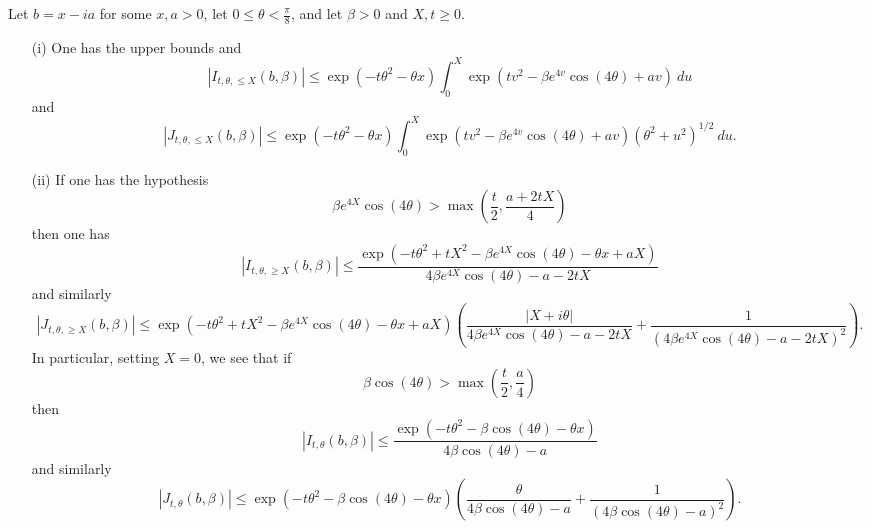 \begin{proposition}\label{tail estimates}  Let $b = x-ia$ for some $x,a>0$, let $0 \leq \theta < \frac{\pi}{8}$, and let $\beta>0$ and $X, t \geq 0$.
\begin{itemize}
\item[(i)]  One has the upper bounds
and
\begin{equation}\label{ihead}
|I_{t,\theta,\leq X}(b,\beta)| \leq \exp( -t \theta^2 - \theta x ) \int_0^X \exp( tv^2 - \beta e^{4v} \cos(4\theta) + av ) \ du
\end{equation}
and
\begin{equation}\label{jhead}
|J_{t,\theta,\leq X}(b,\beta)| \leq \exp( -t \theta^2 - \theta x ) \int_0^X \exp( tv^2 - \beta e^{4v} \cos(4\theta) + av ) (\theta^2 + u^2)^{1/2}\ du.
\end{equation}
\item[(ii)]  If one has the hypothesis
\begin{equation}\label{beta-bound}
 \beta e^{4X} \cos(4\theta) > \max( \frac{t}{2}, \frac{a+2tX}{4}) 
\end{equation}
then one has
\begin{equation}\label{I-tail}
|I_{t,\theta,\geq X}(b,\beta)| \leq \frac{\exp( -t \theta^2 + tX^2 - \beta e^{4X} \cos(4\theta) - \theta x + aX )}{4 \beta e^{4X} \cos(4\theta) - a - 2tX}
\end{equation}
and similarly
\begin{equation}\label{J-tail}
|J_{t,\theta,\geq X}(b,\beta)| \leq \exp( -t \theta^2 + tX^2 - \beta e^{4X} \cos(4\theta) - \theta x + aX ) \left(\frac{|X+i\theta|}{4 \beta e^{4X} \cos(4\theta) - a- 2tX} + \frac{1}{(4 \beta e^{4X} \cos(4\theta) - a- 2tX)^2}\right).
\end{equation}
In particular, setting $X=0$, we see that if
\begin{equation}\label{beta-bound-0}
 \beta \cos(4\theta) > \max( \frac{t}{2}, \frac{a}{4}) 
\end{equation}
then
\begin{equation}\label{I-all}
|I_{t,\theta}(b,\beta)| \leq \frac{\exp( -t \theta^2 - \beta \cos(4\theta) - \theta x )}{4 \beta \cos(4\theta) - a}
\end{equation}
and similarly
\begin{equation}\label{J-all}
|J_{t,\theta}(b,\beta)| \leq \exp( -t \theta^2 - \beta \cos(4\theta) - \theta x ) \left(\frac{\theta}{4 \beta \cos(4\theta) - a} + \frac{1}{(4 \beta \cos(4\theta) - a)^2}\right).
\end{equation}
\end{itemize}
\end{proposition}


